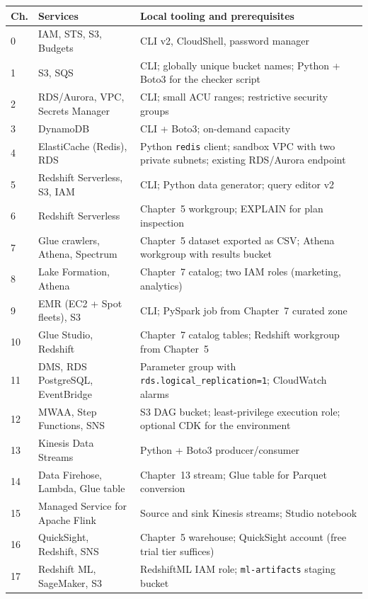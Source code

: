 \begin{center}
\footnotesize
\begin{tabular}{@{}p{1.1cm}p{5.1cm}p{8.6cm}@{}}
\toprule
\textbf{Ch.} & \textbf{Services} & \textbf{Local tooling and prerequisites} \\
\midrule
0 & IAM, STS, S3, Budgets & CLI v2, CloudShell, password manager \\
1 & S3, SQS & CLI; globally unique bucket names; Python + Boto3 for the checker script \\
2 & RDS/Aurora, VPC, Secrets Manager & CLI; small ACU ranges; restrictive security groups \\
3 & DynamoDB & CLI + Boto3; on-demand capacity \\
4 & ElastiCache (Redis), RDS & Python \texttt{redis} client; sandbox VPC with two private subnets; existing RDS/Aurora endpoint \\
5 & Redshift Serverless, S3, IAM & CLI; Python data generator; query editor v2 \\
6 & Redshift Serverless & Chapter~5 workgroup; EXPLAIN for plan inspection \\
7 & Glue crawlers, Athena, Spectrum & Chapter~5 dataset exported as CSV; Athena workgroup with results bucket \\
8 & Lake Formation, Athena & Chapter~7 catalog; two IAM roles (marketing, analytics) \\
9 & EMR (EC2 + Spot fleets), S3 & CLI; PySpark job from Chapter~7 curated zone \\
10 & Glue Studio, Redshift & Chapter~7 catalog tables; Redshift workgroup from Chapter~5 \\
11 & DMS, RDS PostgreSQL, EventBridge & Parameter group with \texttt{rds.logical\_replication=1}; CloudWatch alarms \\
12 & MWAA, Step Functions, SNS & S3 DAG bucket; least-privilege execution role; optional CDK for the environment \\
13 & Kinesis Data Streams & Python + Boto3 producer/consumer \\
14 & Data Firehose, Lambda, Glue table & Chapter~13 stream; Glue table for Parquet conversion \\
15 & Managed Service for Apache Flink & Source and sink Kinesis streams; Studio notebook \\
16 & QuickSight, Redshift, SNS & Chapter~5 warehouse; QuickSight account (free trial tier suffices) \\
17 & Redshift ML, SageMaker, S3 & RedshiftML IAM role; \texttt{ml-artifacts} staging bucket \\

\end{tabular}
\end{center}
